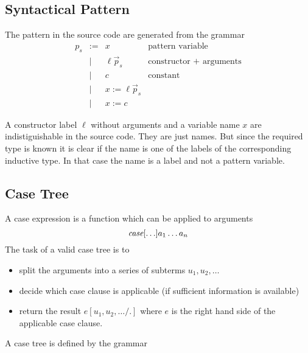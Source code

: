 \subsection{Syntactical Pattern}

The pattern in the source code are generated from the grammar
$$
\begin{array}{llll}
    p_s
    &:=&   x                   & \text{pattern variable}
    \\
    &\mid& \ell \vec p_s       & \text{constructor + arguments}
    \\
    &\mid& c                   & \text{constant}
    \\
    &\mid& x := \ell \vec p_s
    \\
    &\mid& x := c
\end{array}
$$


A constructor label $\ell$ without arguments and a variable name $x$ are
indistiguishable in the source code. They are just names. But since the required
type is known it is clear if the name is one of the labels of the corresponding
inductive type. In that case the name is a label and not a pattern variable.






\subsection{Case Tree}

A case expression is a function which can be applied to arguments
$$
    {\text{\it case}}[\ldots] a_1 \ldots a_n
$$
%
The task of a valid case tree is to
\begin{itemize}
    \item split the arguments into a series of subterms $u_1,u_2, \ldots$

    \item decide which case clause is applicable (if sufficient information is
        available)

    \item return the result $e[u_1, u_2, \ldots / .]$ where $e$ is the right
        hand side of the applicable case clause.
\end{itemize}

A case tree is defined by the grammar

